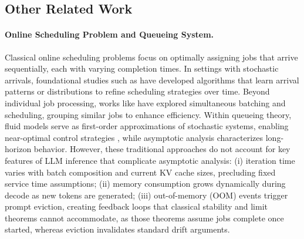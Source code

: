 
\subsection{Other Related Work}

\paragraph*{Online Scheduling Problem and Queueing System.} 
Classical online scheduling problems focus on optimally assigning jobs that arrive sequentially, each with varying completion times. In settings with stochastic arrivals, foundational studies such as \cite{devanur2009adwords,vee2010optimal,cole2014sample,balkanski2016power,lattanzi2020online} have developed algorithms that learn arrival patterns or distributions to refine scheduling strategies over time. Beyond individual job processing, works like \cite{im2013online,lucier2013efficient,liu2015online,li2020online} have explored simultaneous batching and scheduling, grouping similar jobs to enhance efficiency. Within queueing theory, fluid models serve as first-order approximations of stochastic systems, enabling near-optimal control strategies \cite{mandelbaum1998strong,maglaras2000discrete,bauerle2002optimal,liu2011network}, while asymptotic analysis characterizes long-horizon behavior. However, these traditional approaches do not account for key features of LLM inference that complicate asymptotic analysis: (i) iteration time varies with batch composition and current KV cache sizes, precluding fixed service time assumptions; (ii) memory consumption grows dynamically during decode as new tokens are generated; (iii) out-of-memory (OOM) events trigger prompt eviction, creating feedback loops that classical stability and limit theorems cannot accommodate, as those theorems assume jobs complete once started, whereas eviction invalidates standard drift arguments.

